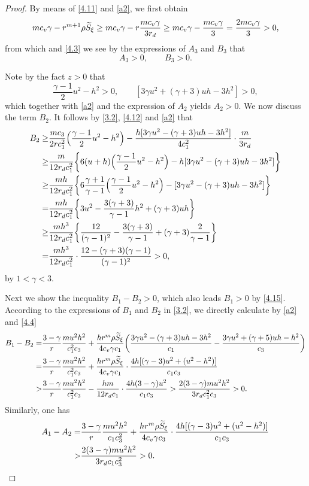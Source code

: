 \documentclass[11pt,reqno]{article}
\newcommand{\fr}{\frac}
\numberwithin{equation}{section}
\begin{document}
\begin{proof}
By means of \eqref{4.11} and \eqref{a2}, we first obtain
\begin{align}
mc_v\gamma -r^{m+1}\rho \widetilde{S}_\xi
\geq mc_v\gamma-r\fr{mc_v\gamma}{3r_d}\geq mc_v\gamma-\fr{mc_v\gamma}{3}=\fr{2mc_v\gamma}{3}>0, \notag
\end{align}
from which and \eqref{4.3} we see by the expressions of $A_3$ and $B_3$ that
$$
A_3>0,\qquad B_3>0.
$$

Note by the fact $z>0$ that
$$
\fr{\gamma-1}{2}u^2-h^2>0,\qquad [3\gamma u^2+(\gamma+3)uh-3h^2]>0,
$$
which together with \eqref{a2} and the expression of $A_2$ yields $A_2>0$. We now discuss the term $B_2$. It follows by \eqref{3.2}, \eqref{4.12} and \eqref{a2} that
\begin{align}\label{4.15}
B_{2} \geq & \fr{mc_3}{2rc_{1}^2}\Big(\fr{\gamma-1}{2}u^2-h^2\Big) -\fr{h[3\gamma u^2-(\gamma+3)uh-3h^2]}{4 c_{1}^2}\cdot \fr{m}{3r_d} \notag \\
\geq & \fr{m}{12r_dc_{1}^2}\bigg\{6(u+h)\Big(\fr{\gamma-1}{2}u^2-h^2\Big) -h[3\gamma u^2-(\gamma+3)uh-3h^2]\bigg\} \notag \\
\geq & \fr{mh}{12r_dc_{1}^2}\bigg\{6\fr{\gamma+1}{\gamma-1}\Big(\fr{\gamma-1}{2}u^2-h^2\Big) - [3\gamma u^2-(\gamma+3)uh-3h^2]\bigg\} \notag \\
= & \fr{mh}{12r_dc_{1}^2}\bigg\{3u^2-\fr{3(\gamma+3)}{\gamma-1}h^2 +(\gamma+3)uh\bigg\} \notag \\
\geq & \fr{mh^3}{12r_dc_{1}^2}\bigg\{\fr{12}{(\gamma-1)^2}-\fr{3(\gamma+3)}{\gamma-1}  +(\gamma+3)\fr{2}{\gamma-1}\bigg\} \notag \\
= & \fr{mh^3}{12r_dc_{1}^2}\cdot\fr{12-(\gamma+3)(\gamma-1)}{(\gamma-1)^2}>0,
\end{align}
by $1<\gamma<3$.

Next we show the inequality $B_1-B_2>0$, which also leads $B_1>0$ by \eqref{4.15}. According to the expressions of $B_1$ and $B_2$ in \eqref{3.2}, we directly calculate by \eqref{a2} and \eqref{4.4}
\begin{align}\label{4.16}
B_1-B_{2}=&\fr{3-\gamma}{r}\fr{mu^2h^2}{c_{1}^2c_3}+\fr{hr^m\rho \widetilde{S}_\xi}{4c_v\gamma c_1}\bigg(\fr{3\gamma u^2-(\gamma+3)uh-3h^2}{c_1} -\fr{3\gamma u^2+(\gamma+5)uh-h^2}{c_3}\bigg) \notag \\
=&\fr{3-\gamma}{r}\fr{mu^2h^2}{c_{1}^2c_3}+\fr{hr^m\rho \widetilde{S}_\xi}{4c_v\gamma c_1}\cdot\fr{4h[(\gamma-3)u^2+(u^2-h^2)]}{c_1c_3} \notag \\
>&\fr{3-\gamma}{r}\fr{mu^2h^2}{c_{1}^2c_3}-\fr{hm}{12 r_d c_1}\cdot\fr{4h(3-\gamma)u^2}{c_1c_3}> \fr{2(3-\gamma)mu^2h^2}{3r_dc_{1}^2c_3}>0.
\end{align}
Similarly, one has
\begin{align}\label{4.17}
A_1-A_{2}
=&\fr{3-\gamma}{r}\fr{mu^2h^2}{c_{1}c_{3}^2}+\fr{hr^m\rho \widetilde{S}_\xi}{4c_v\gamma c_3}\cdot\fr{4h[(\gamma-3)u^2+(u^2-h^2)]}{c_1c_3} \notag \\
>&  \fr{2(3-\gamma)mu^2h^2}{3r_dc_{1}c_{3}^2}>0.
\end{align}


\end{proof}
\end{document}
